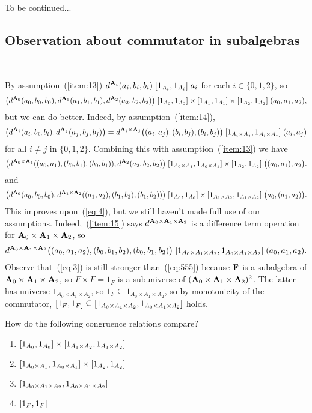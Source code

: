 \medskip
To be continued...

\bigskip

\subsection{Observation about commutator in subalgebras}
~

\noindent By assumption~(\ref{item:13}) $d^{\mathbf{A}_i}(a_i, b_i, b_i) \mathrel{[1_{A_i}, 1_{A_i}]} a_i$ for
each $i \in \{0,1,2\}$, so
\begin{equation}
  \label{eq:4}
\bigl(d^{\mathbf{A}_0}(a_0, b_0, b_0), d^{\mathbf{A}_1}(a_1, b_1, b_1), d^{\mathbf{A}_2}(a_2, b_2, b_2)\bigr)
 \mathrel{[1_{A_0}, 1_{A_0}] \times  [1_{A_1}, 1_{A_1}] \times [1_{A_2}, 1_{A_2}]} (a_0, a_1, a_2),
\end{equation}
but we can do better.
Indeed, by assumption~(\ref{item:14}),
\[
\bigl(d^{\mathbf{A}_i}(a_i, b_i, b_i), d^{\mathbf{A}_j}(a_j, b_j, b_j)\bigr)
=d^{\mathbf{A}_i\times \mathbf{A}_j}\bigl((a_i, a_j), (b_i,b_j), (b_i, b_j)\bigr)
\mathrel{[1_{A_i\times A_j}, 1_{A_i\times A_j}]} (a_i, a_j)
\]
for all $i\neq j$ in $\{0,1,2\}$.
Combining this with assumption~(\ref{item:13}) we have
\[
\bigl(d^{\mathbf{A}_0\times \mathbf{A}_1}((a_0, a_1), (b_0,b_1), (b_0, b_1)),
d^{\mathbf{A}_2}(a_2, b_2,b_2)\bigr)
\mathrel{[1_{A_0\times A_1}, 1_{A_0\times A_1}] \times [1_{A_2}, 1_{A_2}]}
\bigl((a_0, a_1),a_2\bigr).
\]
and 
\[
\bigl(d^{\mathbf{A}_0}(a_0, b_0, b_0), d^{\mathbf{A}_1\times \mathbf{A}_2}((a_1, a_2), (b_1,b_2), (b_1, b_2))\bigr)
\mathrel{[1_{A_0}, 1_{A_0}] \times [1_{A_1\times A_2}, 1_{A_1\times A_2}]} \bigl(a_0, (a_1, a_2)\bigr).
\]
This improves upon~(\ref{eq:4}), but we still haven't made full use of our
assumptions.
Indeed,~(\ref{item:15}) says
$d^{\mathbf{A}_0\times \mathbf{A}_1 \times \mathbf{A}_2}$ is a difference term operation for 
$\mathbf{A}_0\times \mathbf{A}_1 \times \mathbf{A}_2$, so
\begin{equation}
    \label{eq:555}
  d^{\mathbf{A}_0\times \mathbf{A}_1 \times \mathbf{A}_2}\bigl((a_0, a_1, a_2), (b_0, b_1, b_2), (b_0, b_1, b_2)\bigr)
  \mathrel{[1_{A_0\times A_1\times A_2}, 1_{A_0\times A_1\times A_2}]} (a_0, a_1, a_2).
\end{equation}
Observe that~(\ref{eq:3}) is still stronger than~(\ref{eq:555})
because $\mathbf{F}$ is a subalgebra of $\mathbf{A}_0\times \mathbf{A}_1 \times \mathbf{A}_2$, so 
$F \times F = 1_F$ is a subuniverse of
$(\mathbf{A}_0 \times \mathbf{A}_1 \times \mathbf{A}_2)^2$.  The latter has universe
$1_{A_0 \times A_1 \times A_2}$, so
$1_F \subseteq 1_{A_0 \times A_1 \times A_2}$, so by monotonicity of the commutator,
$[1_F, 1_F] \subseteq [1_{A_0\times A_1\times A_2}, 1_{A_0\times A_1\times A_2}]$ holds.



 How do the following congruence relations compare?
\begin{enumerate}
\item $[1_{A_0}, 1_{A_0}] \times [1_{A_1\times A_2}, 1_{A_1\times A_2}]$
\item $[1_{A_0\times A_1}, 1_{A_0\times A_1}] \times [1_{A_2}, 1_{A_2}]$
\item $[1_{A_0\times A_1\times A_2}, 1_{A_0\times A_1\times A_2}]$
\item $[1_F, 1_F]$
\end{enumerate}


